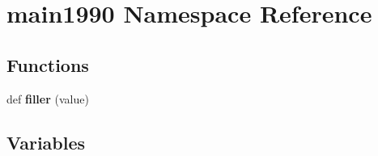 \hypertarget{namespacemain1990}{}\section{main1990 Namespace Reference}
\label{namespacemain1990}
\subsection*{Functions}
\begin{DoxyCompactItemize}
\item 
def {\bfseries filler} (value)\hypertarget{namespacemain1990_aa1c9c8859dbb8db274d5d0ec62b542c8}{}\label{namespacemain1990_aa1c9c8859dbb8db274d5d0ec62b542c8}

\end{DoxyCompactItemize}
\subsection*{Variables}
